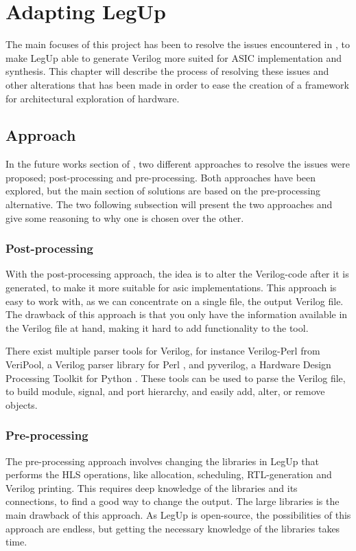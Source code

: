 \chapter{\label{chp:adaptinglegup}Adapting LegUp}
The main focuses of this project has been to resolve the issues encountered in \cite{holm2015pro}, to make LegUp able to generate Verilog more suited for ASIC implementation and synthesis. This chapter will describe the process of resolving these issues and other alterations that has been made in order to ease the creation of a framework for architectural exploration of hardware.
\section{Approach}
In the future works section of \cite{holm2015pro}, two different approaches to resolve the issues were proposed; post-processing and pre-processing. Both approaches have been explored, but the main section of solutions are based on the pre-processing alternative. The two following subsection will present the two approaches and give some reasoning to why one is chosen over the other.
\subsection{Post-processing}
With the post-processing approach, the idea is to alter the Verilog-code after it is generated, to make it more suitable for \gls{asic} implementations. This approach is easy to work with, as we can concentrate on a single file, the output Verilog file. The drawback of this approach is that you only have the information available in the Verilog file at hand, making it hard to add functionality to the tool.

There exist multiple parser tools for Verilog, for instance Verilog-Perl from VeriPool, a Verilog parser library for Perl \cite{verilogperl}, and pyverilog, a Hardware Design Processing Toolkit for Python \cite{Takamaeda2015Pyverilog}. These tools can be used to parse the Verilog file, to build module, signal, and port hierarchy, and easily add, alter, or remove objects.
\subsection{Pre-processing}
The pre-processing approach involves changing the libraries in LegUp that performs the HLS operations, like allocation, scheduling, RTL-generation and Verilog printing. This requires deep knowledge of the libraries and its connections, to find a good way to change the output. The large libraries is the main drawback of this approach. As LegUp is open-source, the possibilities of this approach are endless, but getting the necessary knowledge of the libraries takes time.
